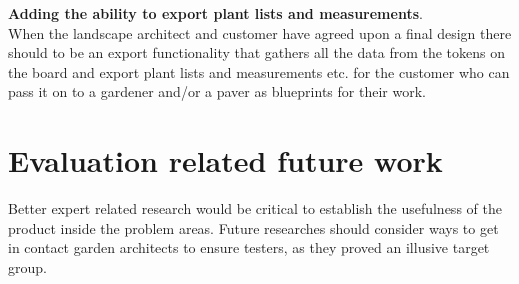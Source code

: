 \textbf{Adding the ability to export plant lists and measurements}.\\
When the landscape architect and customer have agreed upon a final design there should to be an export functionality that gathers all the data from the tokens on the board and export plant lists and measurements etc. for the customer who can pass it on to a gardener and/or a paver as blueprints for their work.

\section{Evaluation related future work}

Better expert related research would be critical to establish the usefulness of the product inside the problem areas. Future researches should consider ways to get in contact garden architects to ensure testers, as they proved an illusive target group.